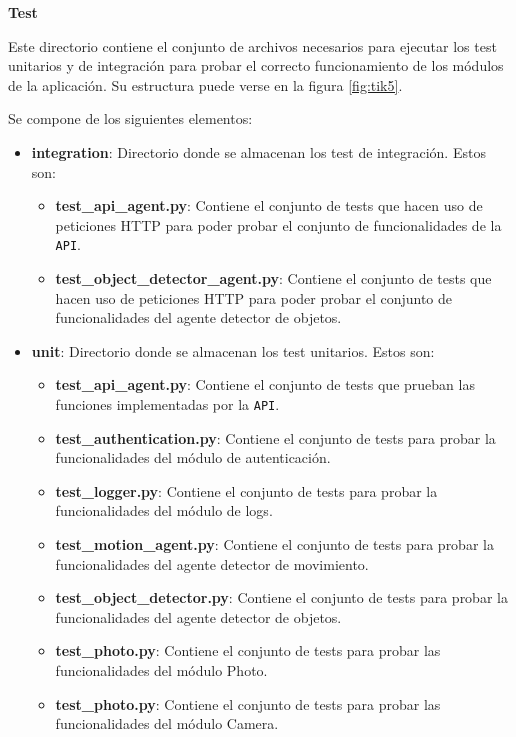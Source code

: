 \textbf{Test}

Este directorio contiene el conjunto de archivos necesarios para ejecutar los test unitarios y de integración para probar el correcto funcionamiento de los módulos de la aplicación. Su estructura puede verse en la figura \ref{fig:tik5}.

Se compone de los siguientes elementos:

\vspace{-0.5cm}

\begin{itemize}
\item \textbf{integration}: Directorio donde se almacenan los test de integración. Estos son:

	\begin{itemize}
	\item \textbf{test\_api\_agent.py}: Contiene el conjunto de tests que hacen uso de peticiones HTTP para poder probar el conjunto de funcionalidades de la \texttt{API}.
	\item \textbf{test\_object\_detector\_agent.py}: Contiene el conjunto de tests que hacen uso de peticiones HTTP para poder probar el conjunto de funcionalidades del agente detector de objetos.
	\end{itemize}

\item \textbf{unit}: Directorio donde se almacenan los test unitarios. Estos son:

	\begin{itemize}
	\item \textbf{test\_api\_agent.py}: Contiene el conjunto de tests que prueban las funciones implementadas por la \texttt{API}.
	\item \textbf{test\_authentication.py}: Contiene el conjunto de tests para probar la funcionalidades del módulo de autenticación.
	\item \textbf{test\_logger.py}: Contiene el conjunto de tests para probar la funcionalidades del módulo de logs.
	\item \textbf{test\_motion\_agent.py}: Contiene el conjunto de tests para probar la funcionalidades del agente detector de movimiento.
	\item \textbf{test\_object\_detector.py}: Contiene el conjunto de tests para probar la funcionalidades del agente detector de objetos.
	\item \textbf{test\_photo.py}: Contiene el conjunto de tests para probar las funcionalidades del módulo Photo.
	\item \textbf{test\_photo.py}: Contiene el conjunto de tests para probar las funcionalidades del módulo Camera.
	\end{itemize}


\end{itemize}
